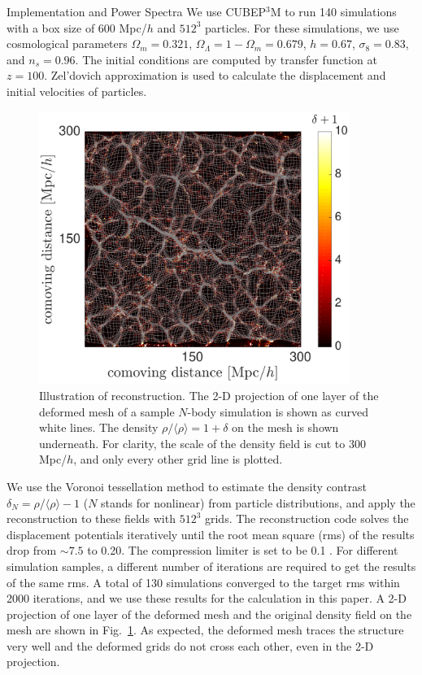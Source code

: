 \begin{section}{Implementation and Power Spectra}
  \label{sec:simulation}
  We use \textsc{CUBEP$^3$M} \citep{bib:Harnois2013} to run
  140 simulations with a box size of 600 Mpc/$h$ and $512^3$ particles.
  For these simulations, we use cosmological
  parameters $\Omega_m=0.321$, $\Omega_{\Lambda}=1-\Omega_m=0.679$,
  $h=0.67$, $\sigma_8=0.83$, and $n_s=0.96$.
  The initial conditions are computed by
  transfer function \citep{bib:Lewis2000}
  at $z=100$.
  Zel'dovich
  approximation is used to calculate the displacement and initial velocities
  of particles.

  \begin{figure}
    \centering
    \includegraphics[width=0.9\textwidth]{fig1.pdf}
    \caption{ Illustration of  reconstruction.
      The 2-D projection of one layer of the deformed mesh of a sample
      $N$-body simulation is shown as curved white lines.  The
      density $\rho/\langle\rho\rangle=1+\delta$ on the mesh is shown
      underneath. For clarity, the scale of the density field is cut to 
      300 Mpc/$h$, and only every other grid line is plotted.}
    \label{fig:simandrec}
 \end{figure}

 We use the Voronoi tessellation method \citep{bib:Van1994} to estimate the density contrast
 $\delta_N=\rho/\langle\rho\rangle-1$ ($N$ stands for nonlinear) from particle distributions, and apply the
  reconstruction to these fields with $512^3$ grids.
 The reconstruction code solves the displacement potentials iteratively
 until the root mean square (rms) of the results drop from $\sim 7.5$
 to 0.20. The compression limiter is set to be 0.1 \citep{bib:Pen1995, bib:Pen1998,bib:ZhuH2016}. 
 For different simulation samples, a different number of
 iterations are required to get the results of the same rms. A total of
 130 simulations converged to the target rms within 2000 iterations, 
 and we use these results for the calculation in this paper.
 A 2-D projection
 of one layer of the deformed mesh and the original density field on
 the mesh are shown in Fig.~\ref{fig:simandrec}. 
 As expected, the deformed mesh traces the structure very well and
 the deformed grids do not cross each other, even in the 2-D projection.
 

\end{section}
